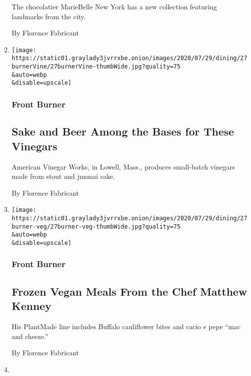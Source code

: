 \begin{enumerate}
  The chocolatier MarieBelle New York has a new collection featuring
  landmarks from the city.

  By Florence Fabricant
\item
  \href{/2020/07/27/dining/american-vinegar-works.html}{}

  \texttt{[image: https://static01.graylady3jvrrxbe.onion/images/2020/07/29/dining/27burnerVine/27burnerVine-thumbWide.jpg?quality=75\\\&auto=webp\\\&disable=upscale]}

  \hypertarget{front-burner-3}{%
  \subsubsection{Front Burner}\label{front-burner-3}}

  \hypertarget{sake-and-beer-among-the-bases-for-these-vinegars}{%
  \subsection{Sake and Beer Among the Bases for These
  Vinegars}\label{sake-and-beer-among-the-bases-for-these-vinegars}}

  American Vinegar Works, in Lowell, Mass., produces small-batch
  vinegars made from stout and junmai sake.

  By Florence Fabricant
\item
  \href{/2020/07/27/dining/matthew-kenney-vegan-meals.html}{}

  \texttt{[image: https://static01.graylady3jvrrxbe.onion/images/2020/07/29/dining/27burner-veg/27burner-veg-thumbWide.jpg?quality=75\\\&auto=webp\\\&disable=upscale]}

  \hypertarget{front-burner-4}{%
  \subsubsection{Front Burner}\label{front-burner-4}}

  \hypertarget{frozen-vegan-meals-from-the-chef-matthew-kenney}{%
  \subsection{Frozen Vegan Meals From the Chef Matthew
  Kenney}\label{frozen-vegan-meals-from-the-chef-matthew-kenney}}

  His PlantMade line includes Buffalo cauliflower bites and cacio e pepe
  ``mac and cheeze.''

  By Florence Fabricant
\item
  \href{/2020/07/27/dining/yak-grills.html}{}


\end{enumerate}
